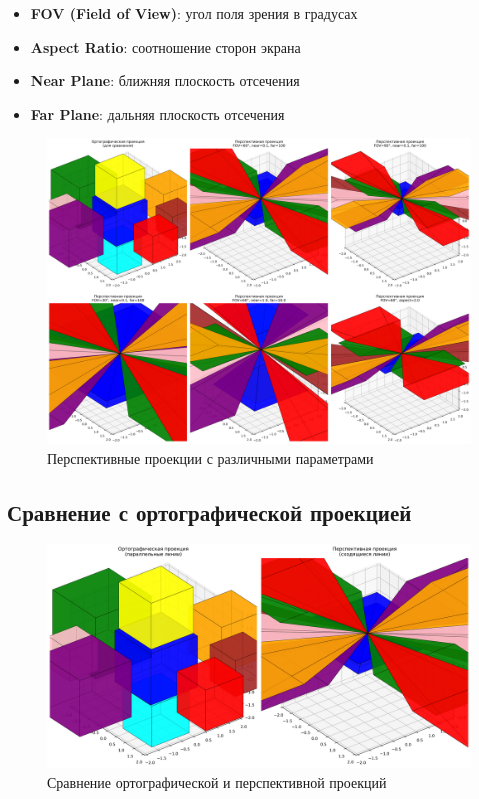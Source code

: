 \begin{itemize}
\item \textbf{FOV (Field of View)}: угол поля зрения в градусах
\item \textbf{Aspect Ratio}: соотношение сторон экрана
\item \textbf{Near Plane}: ближняя плоскость отсечения
\item \textbf{Far Plane}: дальняя плоскость отсечения
\end{itemize}

\begin{figure}[h]
\centering
\includegraphics[width=\textwidth]{images/task7/perspective_projections.png}
\caption{Перспективные проекции с различными параметрами}
\label{fig:perspective_projections}
\end{figure}

\subsection*{Сравнение с ортографической проекцией}

\begin{figure}[h]
\centering
\includegraphics[width=\textwidth]{images/task7/orthographic_vs_perspective.png}
\caption{Сравнение ортографической и перспективной проекций}
\label{fig:orthographic_vs_perspective}
\end{figure}

